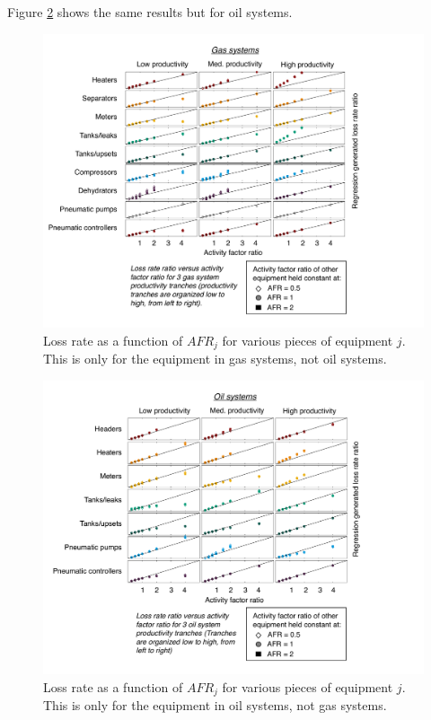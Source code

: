 \documentclass[11pt]{report}
\begin{document}
Figure \ref{fig:AFproxy2} shows the same results but for oil systems.

 \begin{figure}[t]
\includegraphics[width=1\columnwidth]{images/ProxyAF_Model_Pic1.pdf}
\caption{Loss rate as a function of $AFR_j$ for various pieces of equipment $j$. This is only for the equipment in gas systems, not oil systems.}
\label{fig:AFproxy1}
\end{figure}  

 \begin{figure}[t]
\includegraphics[width=1\columnwidth]{images/ProxyAF_Model_Pic2.pdf}
\caption{Loss rate as a function of $AFR_j$ for various pieces of equipment $j$. This is only for the equipment in oil systems, not gas systems.}
\label{fig:AFproxy2}
\end{figure}  
\end{document}
